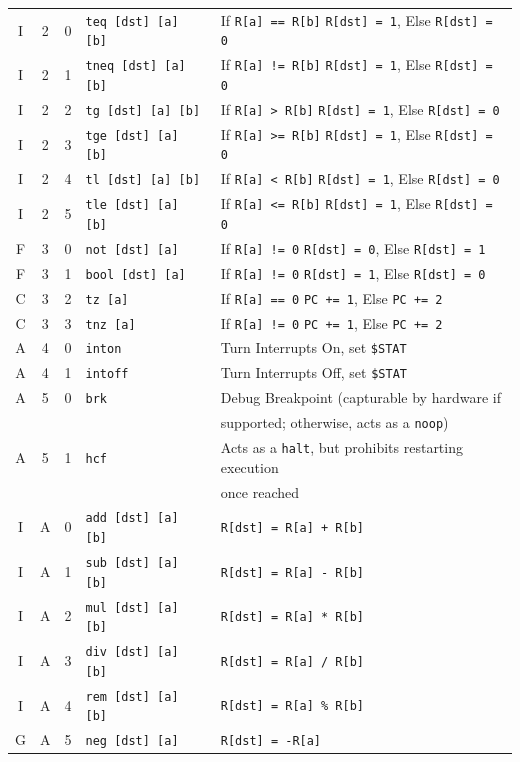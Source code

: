 \documentclass{article}
\begin{document}
\begin{table}[h!]
\begin{footnotesize}
\begin{tabular}{c|cc|l|l}
			I & 2 & 0 & \texttt{teq [dst] [a] [b]} & If \texttt{R[a] == R[b]} \texttt{R[dst] = 1}, Else \texttt{R[dst] = 0} \\
			I & 2 & 1 & \texttt{tneq [dst] [a] [b]} & If \texttt{R[a] != R[b]} \texttt{R[dst] = 1}, Else \texttt{R[dst] = 0} \\
			I & 2 & 2 & \texttt{tg [dst] [a] [b]} & If \texttt{R[a] > R[b]} \texttt{R[dst] = 1}, Else \texttt{R[dst] = 0} \\
			I & 2 & 3 & \texttt{tge [dst] [a] [b]} & If \texttt{R[a] >= R[b]} \texttt{R[dst] = 1}, Else \texttt{R[dst] = 0} \\
			I & 2 & 4 & \texttt{tl [dst] [a] [b]} & If \texttt{R[a] < R[b]} \texttt{R[dst] = 1}, Else \texttt{R[dst] = 0} \\
			I & 2 & 5 & \texttt{tle [dst] [a] [b]} & If \texttt{R[a] <= R[b]} \texttt{R[dst] = 1}, Else \texttt{R[dst] = 0} \\

			F & 3 & 0 & \texttt{not [dst] [a]} & If \texttt{R[a] != 0} \texttt{R[dst] = 0}, Else \texttt{R[dst] = 1} \\
			F & 3 & 1 & \texttt{bool [dst] [a]} & If \texttt{R[a] != 0} \texttt{R[dst] = 1}, Else \texttt{R[dst] = 0} \\
			C & 3 & 2 & \texttt{tz [a]} & If \texttt{R[a] == 0} \texttt{PC += 1}, Else \texttt{PC += 2} \\
			C & 3 & 3 & \texttt{tnz [a]} & If \texttt{R[a] != 0} \texttt{PC += 1}, Else \texttt{PC += 2} \\

			A & 4 & 0 & \texttt{inton} & Turn Interrupts On, set \texttt{\$STAT} \\
			A & 4 & 1 & \texttt{intoff} & Turn Interrupts Off, set \texttt{\$STAT} \\

			A & 5 & 0 & \texttt{brk} & Debug Breakpoint (capturable by hardware if \\
			{} & {} & {} & {} & supported; otherwise, acts as a \texttt{noop}) \\
			A & 5 & 1 & \texttt{hcf} & Acts as a \texttt{halt}, but prohibits restarting execution \\
			{} & {} & {} & {} & once reached \\

			I & A & 0 & \texttt{add [dst] [a] [b]} & \texttt{R[dst] = R[a] + R[b]} \\
			I & A & 1 & \texttt{sub [dst] [a] [b]} & \texttt{R[dst] = R[a] - R[b]} \\
			I & A & 2 & \texttt{mul [dst] [a] [b]} & \texttt{R[dst] = R[a] * R[b]} \\
			I & A & 3 & \texttt{div [dst] [a] [b]} & \texttt{R[dst] = R[a] / R[b]} \\
			I & A & 4 & \texttt{rem [dst] [a] [b]} & \texttt{R[dst] = R[a] \% R[b]} \\
			G & A & 5 & \texttt{neg [dst] [a]} & \texttt{R[dst] = -R[a]} \\


\end{tabular}
\end{footnotesize}
\end{table}
\end{document}
